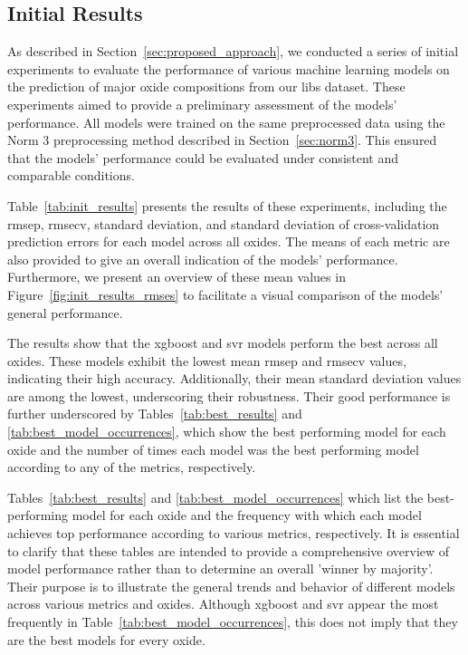 \subsection{Initial Results}
As described in Section~\ref{sec:proposed_approach}, we conducted a series of initial experiments to evaluate the performance of various machine learning models on the prediction of major oxide compositions from our \gls{libs} dataset.
These experiments aimed to provide a preliminary assessment of the models' performance.
All models were trained on the same preprocessed data using the Norm 3 preprocessing method described in Section~\ref{sec:norm3}.
This ensured that the models' performance could be evaluated under consistent and comparable conditions.

Table~\ref{tab:init_results} presents the results of these experiments, including the \gls{rmsep}, \gls{rmsecv}, standard deviation, and standard deviation of cross-validation prediction errors for each model across all oxides.
The means of each metric are also provided to give an overall indication of the models' performance.
Furthermore, we present an overview of these mean values in Figure~\ref{fig:init_results_rmses} to facilitate a visual comparison of the models' general performance.

The results show that the \gls{xgboost} and \gls{svr} models perform the best across all oxides.
These models exhibit the lowest mean \gls{rmsep} and \gls{rmsecv} values, indicating their high accuracy.
Additionally, their mean standard deviation values are among the lowest, underscoring their robustness.
Their good performance is further underscored by Tables~\ref{tab:best_results} and \ref{tab:best_model_occurrences}, which show the best performing model for each oxide and the number of times each model was the best performing model according to any of the metrics, respectively.

Tables~\ref{tab:best_results} and \ref{tab:best_model_occurrences} which list the best-performing model for each oxide and the frequency with which each model achieves top performance according to various metrics, respectively.
It is essential to clarify that these tables are intended to provide a comprehensive overview of model performance rather than to determine an overall 'winner by majority'.
Their purpose is to illustrate the general trends and behavior of different models across various metrics and oxides.
Although \gls{xgboost} and \gls{svr} appear the most frequently in Table~\ref{tab:best_model_occurrences}, this does not imply that they are the best models for every oxide.

